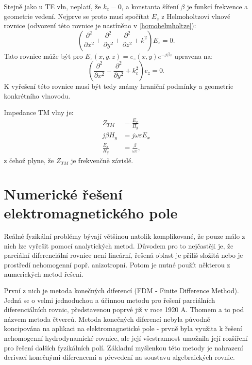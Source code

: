 \documentclass[12pt,a4paper,oneside]{article}
\numberwithin{equation}{section} %
\numberwithin{figure}{section} %
\numberwithin{table}{section} %
\begin{document}
Stejně jako u TE vln, neplatí, že $k_c = 0$, a konstanta šíření $\beta$ je funkcí frekvence a geometrie vedení. Nejprve se proto musí spočítat $E_z$ z Helmoholtzovi vlnové rovnice (odvození této rovnice je nastíněno v \ref{homohelmholtze}):
\begin{equation}
\left( \frac{\partial ^2}{\partial x^2} + \frac{\partial ^2}{\partial y^2} + \frac{\partial ^2}{\partial z^2} + k^2 \right) E_z = 0 .
\end{equation}
Tato rovnice může být pro $E_z(x,y,z) = e_z(x,y)e^{-j \beta z}$ upravena na:
\begin{equation}
\left( \frac{\partial ^2}{\partial x^2} + \frac{\partial ^2}{\partial y^2} + k^2_c \right) e_z = 0 .
\end{equation}
K vyřešení této rovnice musí být tedy známy hraniční podmínky a geometrie konkrétního vlnovodu.

Impedance TM vlny je:
\begin{subequations}
\begin{align}
Z_{TM} &= \frac{E_x}{H_y}
\\
j \beta H_y &= j \omega \varepsilon E_x
\\
\frac{E_x}{H_y} &= \frac{\beta}{\omega \varepsilon} ,
\end{align}
\end{subequations}
z čehož plyne, že $Z_{TM}$ je frekvenčně závislé. \cite{Pozar4}


\newpage
\section{Numerické řešení elektromagnetického pole}
\label{numerika}
Reálné fyzikální problémy bývají většinou natolik komplikované, že pouze málo z nich lze vyřešit pomocí analytických metod. Důvodem pro to nejčastěji je, že parciální diferenciální rovnice není lineární, řešená oblast je příliš složitá nebo je prostředí nehomogenní popř. anizotropní. Potom je nutné použít některou z numerických metod řešení.

První z nich je metoda konečných diferencí (FDM - Finite Difference Method). Jedná se o velmi jednoduchou a účinnou metodu pro řešení parciálních diferenciálních rovnic, představenou poprvé již v roce 1920 A. Thomem a to pod názvem metoda čtverců. Metoda konečných diferencí nebyla původně koncipována na aplikaci na elektromagnetické pole - prvně byla využita k řešení nehomogenní hydrodynamické rovnice, ale její všestrannost umožnila její rozšíření pro řešení dalších fyzikálních polí. Základní myšlenkou této metody je nahrazení derivací konečnými diferencemi a převedení na soustavu algebraických rovnic. \cite{ATE}
\end{document}
